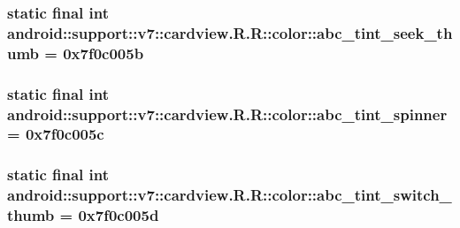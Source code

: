 \hypertarget{classandroid_1_1support_1_1v7_1_1cardview_1_1_r_1_1color_cc4c70da5428826ea442cdd2dc4b7ead}{
\subsubsection[{abc\_\-tint\_\-seek\_\-thumb}]{\setlength{\rightskip}{0pt plus 5cm}static final int android::support::v7::cardview.R.R::color::abc\_\-tint\_\-seek\_\-thumb = 0x7f0c005b}}
\label{classandroid_1_1support_1_1v7_1_1cardview_1_1_r_1_1color_cc4c70da5428826ea442cdd2dc4b7ead}


\hypertarget{classandroid_1_1support_1_1v7_1_1cardview_1_1_r_1_1color_f7e809568a95ff5c01ecb59e872a839c}{
\subsubsection[{abc\_\-tint\_\-spinner}]{\setlength{\rightskip}{0pt plus 5cm}static final int android::support::v7::cardview.R.R::color::abc\_\-tint\_\-spinner = 0x7f0c005c}}
\label{classandroid_1_1support_1_1v7_1_1cardview_1_1_r_1_1color_f7e809568a95ff5c01ecb59e872a839c}


\hypertarget{classandroid_1_1support_1_1v7_1_1cardview_1_1_r_1_1color_b5a474bc1da11ac7f164c934993af7a1}{
\subsubsection[{abc\_\-tint\_\-switch\_\-thumb}]{\setlength{\rightskip}{0pt plus 5cm}static final int android::support::v7::cardview.R.R::color::abc\_\-tint\_\-switch\_\-thumb = 0x7f0c005d}}
\label{classandroid_1_1support_1_1v7_1_1cardview_1_1_r_1_1color_b5a474bc1da11ac7f164c934993af7a1}


